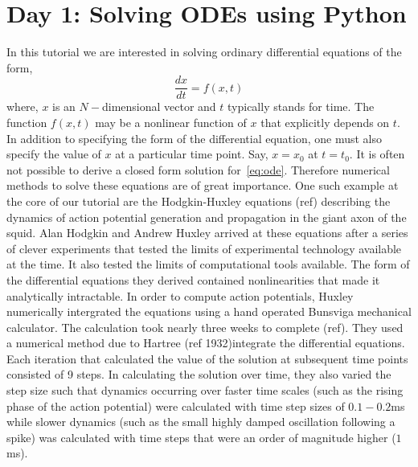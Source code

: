 \documentclass[10pt,letterpaper]{article}
\begin{document}

\section*{Day 1: Solving ODEs using Python}
In this tutorial we are interested in solving ordinary differential equations of the form,
\begin{equation}
\frac{dx}{dt} = f(x, t)
\label{eq:ode}
\end{equation}
where, $x$ is an $N-$dimensional vector and $t$ typically stands for time. The function $f(x,t)$ may be a nonlinear function of $x$ that explicitly depends on $t$. In addition to specifying the form of the differential equation, one must also specify the value of $x$ at a particular time point. Say, $x=x_{0}$ at $t = t_0$. It is often not possible to derive a closed form solution for~\ref{eq:ode}. Therefore numerical methods to solve these equations are of great importance. One such example at the core of our tutorial are the Hodgkin-Huxley equations (ref) describing the dynamics of action potential generation and propagation in the giant axon of the squid. Alan Hodgkin and Andrew Huxley arrived at these equations after a series of clever experiments that tested the limits of experimental technology available at the time. It also tested the limits of computational tools available. The form of the differential equations they derived contained nonlinearities that made it analytically intractable. In order to compute action potentials, Huxley numerically intergrated the equations using a hand operated Bunsviga mechanical calculator. The calculation took nearly three weeks to complete (ref). They used a numerical method due to Hartree (ref 1932)integrate the differential equations. Each iteration that calculated the value of the solution at subsequent time points consisted of 9 steps. In calculating the solution over time, they also varied the step size such that dynamics occurring over faster time scales (such as the rising phase of the action potential) were calculated with time step sizes of $0.1-0.2$ms while slower dynamics (such as the small highly damped oscillation following a spike) was calculated with time steps that were an order of magnitude higher ($1$ms).
\end{document}
